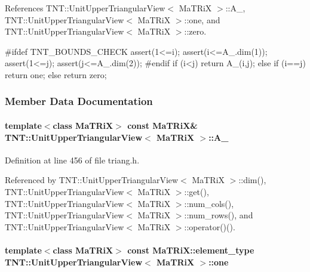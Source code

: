 References TNT::UnitUpperTriangularView$<$ MaTRiX $>$::A\_\-, TNT::UnitUpperTriangularView$<$ MaTRiX $>$::one, and TNT::UnitUpperTriangularView$<$ MaTRiX $>$::zero.




\begin{DoxyCode}
    {
#ifdef TNT_BOUNDS_CHECK
        assert(1<=i);
        assert(i<=A_.dim(1));
        assert(1<=j);
        assert(j<=A_.dim(2));
#endif
        if (i<j)
            return A_(i,j);
        else if (i==j)
            return one;
        else 
            return zero;
    }
\end{DoxyCode}




\subsubsection{Member Data Documentation}
\paragraph[{A\_\-}]{\setlength{\rightskip}{0pt plus 5cm}template$<$class MaTRiX$>$ const MaTRiX\& {\bf TNT::UnitUpperTriangularView}$<$ MaTRiX $>$::{\bf A\_\-}}\hfill\label{class_t_n_t_1_1_unit_upper_triangular_view_aaacee6c2eae01c1c0444d35158b32d67}


Definition at line 456 of file triang.h.



Referenced by TNT::UnitUpperTriangularView$<$ MaTRiX $>$::dim(), TNT::UnitUpperTriangularView$<$ MaTRiX $>$::get(), TNT::UnitUpperTriangularView$<$ MaTRiX $>$::num\_\-cols(), TNT::UnitUpperTriangularView$<$ MaTRiX $>$::num\_\-rows(), and TNT::UnitUpperTriangularView$<$ MaTRiX $>$::operator()().

\paragraph[{one}]{\setlength{\rightskip}{0pt plus 5cm}template$<$class MaTRiX$>$ const MaTRiX::element\_\-type {\bf TNT::UnitUpperTriangularView}$<$ MaTRiX $>$::{\bf one}}\hfill\label{class_t_n_t_1_1_unit_upper_triangular_view_a224f21c9cb2c012e3f232b913992a7c1}


